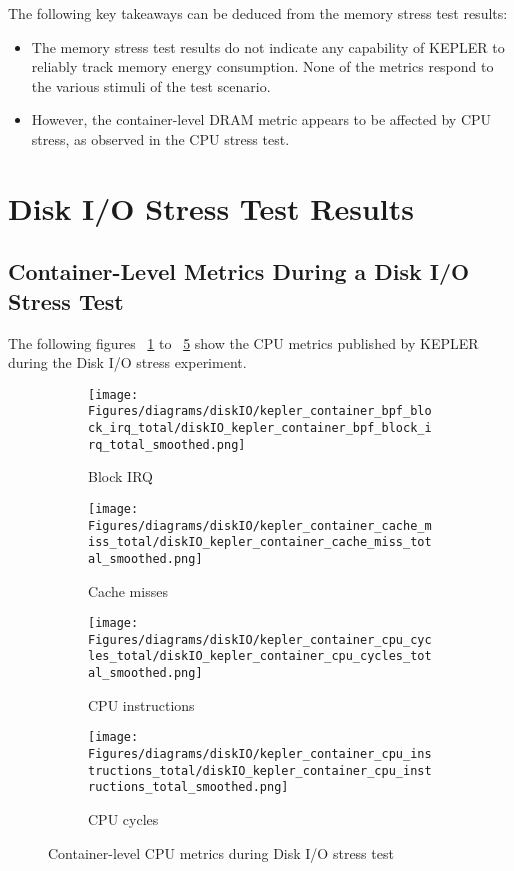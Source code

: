 The following key takeaways can be deduced from the memory stress test results:
\begin{itemize}
    \item The memory stress test results do not indicate any capability of KEPLER to reliably track memory energy consumption. None of the metrics respond to the various stimuli of the test scenario.
    \item However, the container-level DRAM metric appears to be affected by CPU stress, as observed in the CPU stress test.
\end{itemize}


\section{Disk I/O Stress Test Results}

\subsection{Container-Level Metrics During a Disk I/O Stress Test}

The following figures ~\ref{fig:cpu_kepler_container_cache_miss_total} to ~\ref{fig:diskIO_kepler_container_cpu_instructions_total} show the CPU metrics published by KEPLER during the Disk I/O stress experiment.

\begin{figure}[H]
    \centering
    \begin{subfigure}{0.49\textwidth}
        \texttt{[image: Figures/diagrams/diskIO/kepler\_container\_bpf\_block\_irq\_total/diskIO\_kepler\_container\_bpf\_block\_irq\_total\_smoothed.png]}
        \caption{Block IRQ}
        \label{fig:cpu_kepler_container_cache_miss_total}
    \end{subfigure}
    \begin{subfigure}{0.49\textwidth}
        \texttt{[image: Figures/diagrams/diskIO/kepler\_container\_cache\_miss\_total/diskIO\_kepler\_container\_cache\_miss\_total\_smoothed.png]}
        \caption{Cache misses}
        \label{fig:diskIO_kepler_container_cache_miss_total}
    \end{subfigure}
    \begin{subfigure}{0.49\textwidth}
        \texttt{[image: Figures/diagrams/diskIO/kepler\_container\_cpu\_cycles\_total/diskIO\_kepler\_container\_cpu\_cycles\_total\_smoothed.png]}
        \caption{CPU instructions}
        \label{fig:diskIO_kepler_container_cpu_cycles_total}
    \end{subfigure}
    \begin{subfigure}{0.49\textwidth}
        \texttt{[image: Figures/diagrams/diskIO/kepler\_container\_cpu\_instructions\_total/diskIO\_kepler\_container\_cpu\_instructions\_total\_smoothed.png]}
        \caption{CPU cycles}
        \label{fig:diskIO_kepler_container_cpu_instructions_total}
    \end{subfigure}
    \caption{Container-level CPU metrics during Disk I/O stress test}
\end{figure}

